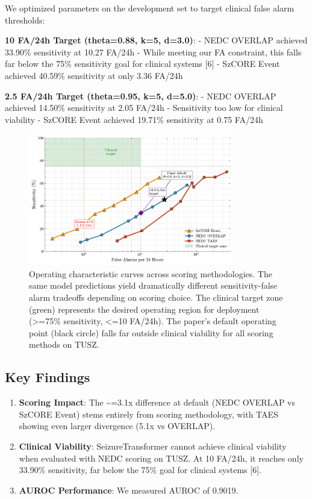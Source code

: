 \documentclass[
]{article}
\begin{document}
We optimized parameters on the development set to target clinical false
alarm thresholds:

\textbf{10 FA/24h Target (theta=0.88, k=5, d=3.0)}: - NEDC OVERLAP
achieved 33.90\% sensitivity at 10.27 FA/24h - While meeting our FA
constraint, this falls far below the 75\% sensitivity goal for clinical
systems {[}6{]} - SzCORE Event achieved 40.59\% sensitivity at only 3.36
FA/24h

\textbf{2.5 FA/24h Target (theta=0.95, k=5, d=5.0)}: - NEDC OVERLAP
achieved 14.50\% sensitivity at 2.05 FA/24h - Sensitivity too low for
clinical viability - SzCORE Event achieved 19.71\% sensitivity at 0.75
FA/24h

\begin{figure}
\hypertarget{fig:operating-curves}{%
\centering
\includegraphics[width=0.8\textwidth,height=\textheight]{figures/output/arxiv/FIGURE_4_operating_curves.pdf}
\caption{Operating characteristic curves across scoring methodologies.
The same model predictions yield dramatically different
sensitivity-false alarm tradeoffs depending on scoring choice. The
clinical target zone (green) represents the desired operating region for
deployment (\textgreater=75\% sensitivity, \textless=10 FA/24h). The
paper's default operating point (black circle) falls far outside
clinical viability for all scoring methods on
TUSZ.}\label{fig:operating-curves}
}
\end{figure}

\hypertarget{key-findings}{%
\subsection{Key Findings}\label{key-findings}}

\begin{enumerate}
\def\labelenumi{\arabic{enumi}.}
\item
  \textbf{Scoring Impact}: The \textasciitilde=3.1x difference at
  default (NEDC OVERLAP vs SzCORE Event) stems entirely from scoring
  methodology, with TAES showing even larger divergence (5.1x vs
  OVERLAP).
\item
  \textbf{Clinical Viability}: SeizureTransformer cannot achieve
  clinical viability when evaluated with NEDC scoring on TUSZ. At 10
  FA/24h, it reaches only 33.90\% sensitivity, far below the 75\% goal
  for clinical systems {[}6{]}.
\item
  \textbf{AUROC Performance}: We measured AUROC of 0.9019.
\end{enumerate}
\end{document}
